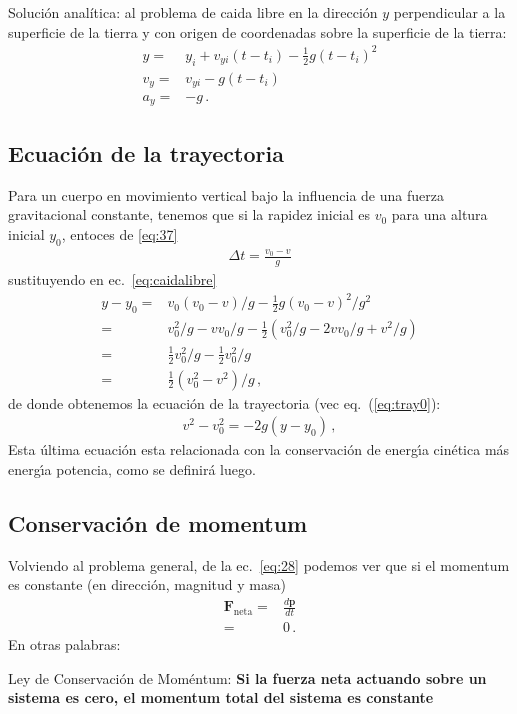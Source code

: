 \begin{frame}
  \begin{block}%
{Solución analítica:} al problema de caida libre en la dirección $y$ perpendicular a la superficie de la tierra y con origen de coordenadas sobre la superficie de la tierra:
\begin{align*}
     y=&y_i+v_{yi}(t-t_i)-\frac{1}{2}g(t-t_i)^2\nonumber\\
     v_y =&v_{yi}-g(t-t_i)\nonumber\\
     a_y=&-g\,.
\end{align*}

  \end{block}
\end{frame}


\subsection{Ecuación de la trayectoria}
Para un cuerpo en movimiento vertical bajo la influencia de una fuerza gravitacional constante, tenemos que si la rapidez inicial es $v_0$ para una altura inicial $y_0$, entoces de \eqref{eq:37}
\begin{align}
  \Delta t=\frac{v_0-v}{g}
\end{align}
sustituyendo en ec.~\eqref{eq:caidalibre}
\begin{align}
  y-y_0=&v_0(v_0-v)/g-\tfrac{1}{2}g(v_0-v)^2/g^2\nonumber\\
       =&v_0^2/g-vv_0/g-\tfrac{1}{2}(v_0^2/g-2vv_0/g+v^2/g)\nonumber\\
       =&\tfrac{1}{2}v_0^2/g-\tfrac{1}{2}v_0^2/g\nonumber\\
       =&\tfrac{1}{2}(v_0^2-v^2)/g\,,
\end{align}
de donde obtenemos la ecuación de la trayectoria (vec eq.~(\ref{eq:tray0}):
\begin{align}
  \label{eq:trayectoriay}
  v^2-v_0^2=-2g(y-y_0)\,,
\end{align}
Esta \'ultima ecuaci\'on esta relacionada con la conservaci\'on de energ\'\i a cin\'etica m\'as energ\'\i a potencia, como se definir\'a luego.


\subsection{Conservación de momentum}
Volviendo al problema general, de la ec.~\eqref{eq:28} podemos ver que si el momentum es constante (en dirección, magnitud y masa)
\begin{align}
  \mathbf{F}_{\text{neta}}=&\frac{d\mathbf{p}}{dt}\nonumber\\
=&0\,.
\end{align}
En otras palabras:
\begin{frame}
  \begin{block}%
{Ley de Conservación de Moméntum:} \textbf{Si la fuerza neta actuando sobre un sistema es cero, el momentum total del sistema es constante}
  \end{block}
\end{frame}


